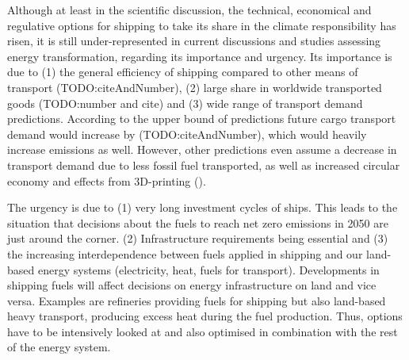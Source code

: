 \documentclass[article]{elsarticle}
\begin{document}
Although at least in the scientific discussion, the technical, economical and regulative options for shipping to take its share in the climate responsibility has risen, it is still under-represented in current discussions and studies assessing energy transformation, regarding its importance and urgency. Its importance is due to (1) the general efficiency of shipping compared to other means of transport (TODO:citeAndNumber), (2) large share in worldwide transported goods (TODO:number and cite) and (3) wide range of transport demand predictions. According to the upper bound of predictions future cargo transport demand would increase by (TODO:citeAndNumber), which would heavily increase emissions as well. However, other predictions even assume a decrease in transport demand due to less fossil fuel transported, as well as increased circular economy and effects from 3D-printing (\cite[p.~18]{ITF2018}).

The urgency is due to (1) very long investment cycles of ships. This leads to the situation that decisions about the fuels to reach net zero emissions in 2050 are just around the corner. (2) Infrastructure requirements being essential and (3) the increasing interdependence between fuels applied in shipping and our land-based energy systems (electricity, heat, fuels for transport). Developments in shipping fuels will affect decisions on energy infrastructure on land and vice versa. Examples are refineries providing fuels for shipping but also land-based heavy transport, producing excess heat during the fuel production. Thus, options have to be intensively looked at and also optimised in combination with the rest of the energy system. 
\end{document}
